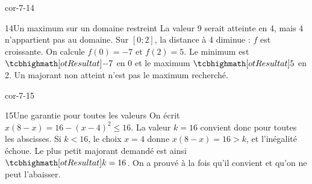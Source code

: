 \begin{blocLivre}{cor-7-14}
\begin{corrige}{14}{Un maximum sur un domaine restreint}
La valeur 9 serait atteinte en 4, mais 4 n’appartient pas au domaine. Sur $[0;2]$, la distance à 4 diminue : $f$ est croissante. On calcule $f(0)=-7$ et $f(2)=5$. Le minimum est $\res{-7}$ en 0 et le maximum $\res5$ en 2. Un majorant non atteint n’est pas le maximum recherché.
\end{corrige}
\end{blocLivre}
\begin{blocLivre}{cor-7-15}
\begin{corrige}{15}{Une garantie pour toutes les valeurs}
On écrit $x(8-x)=16-(x-4)^2\le16$. La valeur $k=16$ convient donc pour toutes les abscisses. Si $k<16$, le choix $x=4$ donne $x(8-x)=16>k$, et l’inégalité échoue. Le plus petit majorant demandé est ainsi $\res{k=16}$. On a prouvé à la fois qu’il convient et qu’on ne peut l’abaisser.
\end{corrige}
\end{blocLivre}

